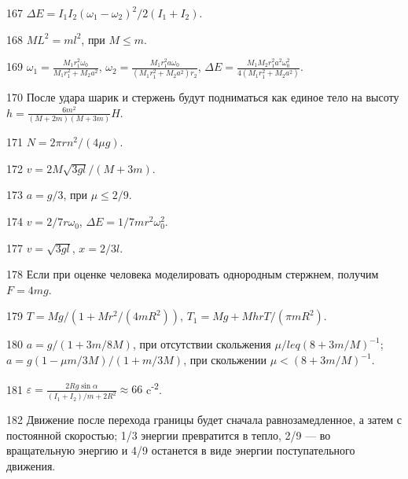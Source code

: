\begin{Answer}{167}
$\Delta E = I_1 I_2 (\omega_1 - \omega_2)^2/ 2(I_1 + I_2)$.
\end{Answer}
\begin{Answer}{168}
$ML^2 = ml^2$, при $M \leq m$.
\end{Answer}
\begin{Answer}{169}
$\omega_1 = \frac{M_1r_1^2\omega_0}{M_1r_1^2 + M_2a^2}$, $\omega_2 = \frac{M_1r_1^2 a \omega_0}{(M_1r_1^2 + M_2a^2)r_2}$, $\Delta E = \frac{M_1 M_2r_1^2a^2\omega_0^2}{4(M_1r_1^2 + M_2a^2)}$.
\end{Answer}
\begin{Answer}{170}
После удара шарик и стержень будут подниматься как единое тело на высоту $h = \frac{6m^2}{(M+2m)(M+3m)}H$.
\end{Answer}
\begin{Answer}{171}
$N = 2\pi r n^2/(4 \mu g)$.
\end{Answer}
\begin{Answer}{172}
$v = 2M\sqrt{3gl}/(M+3m)$.
\end{Answer}
\begin{Answer}{173}
$a = g/3$, при $\mu \leq 2/9$.
\end{Answer}
\begin{Answer}{174}
$v = 2/7r \omega_0$, $\Delta E = 1/7 mr^2 \omega_0^2$.
\end{Answer}
\begin{Answer}{177}
$v = \sqrt{3gl}$, $x = 2/3l$.
\end{Answer}
\begin{Answer}{178}
Если при оценке человека моделировать однородным стержнем, получим $F = 4mg$.
\end{Answer}
\begin{Answer}{179}
$T = Mg/(1 + Mr^2/(4mR^2))$, $T_1 = Mg + MhrT/(\pi m R^2)$.
\end{Answer}
\begin{Answer}{180}
$a = g/(1+3m/8M)$, при отсутствии скольжения $\mu /leq (8+3m/M)^{-1}$; $a = g(1 - \mu m/3M)/(1+m/3M)$, при скольжении $\mu < (8+3m/M)^{-1}$.
\end{Answer}
\begin{Answer}{181}
$\varepsilon = \frac{2Rg \sin \alpha}{(I_1 + I_2)/m + 2R^2} \approx 66$ c\textsuperscript{-2}.
\end{Answer}
\begin{Answer}{182}
Движение после перехода границы будет сначала равнозамедленное, а затем с постоянной скоростью; 1/3 энергии превратится в тепло, 2/9 — во вращательную энергию и 4/9 останется в виде энергии поступательного движения.
\end{Answer}
